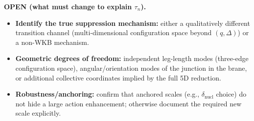 \begin{tcolorbox}[title={Neutron: Status Summary (Routes A--E)}, colback=black!2, colframe=black!35, boxrule=0.6pt]
\medskip
\textbf{OPEN (what must change to explain $\tau_n$).}
\begin{itemize}\setlength\itemsep{0.2em}
  \item \textbf{Identify the true suppression mechanism:} either a qualitatively different transition channel (multi-dimensional configuration space beyond $(q,\Delta)$) or a non-WKB mechanism. \tagOpen{}
  \item \textbf{Geometric degrees of freedom:} independent leg-length modes (three-edge configuration space), angular/orientation modes of the junction in the brane, or additional collective coordinates implied by the full 5D reduction. \tagOpen{}
  \item \textbf{Robustness/anchoring:} confirm that anchored scales (e.g., $\delta_{\mathrm{nucl}}$ choice) do not hide a large action enhancement; otherwise document the required new scale explicitly. \tagOpen{}
\end{itemize}

\end{tcolorbox}

